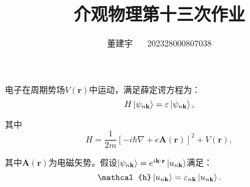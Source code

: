 \documentclass[reqno,a4paper,12pt]{amsart}
\title{介观物理第十三次作业}
\author{董建宇 ~~ 202328000807038}
\begin{document}
\maketitle

电子在周期势场$V(\mathbf{r})$中运动，满足薛定谔方程为：
\[
	H \ket{\psi_{n\mathbf{k}}} = \varepsilon \ket{\psi_{n\mathbf{k}}},
\]

其中
\[
	H = \frac{1}{2m} [-i\hbar\nabla + e\mathbf{A}(\mathbf{r})]^2 + V(\mathbf{r}),
\]

其中$\mathbf{A}(\mathbf{r})$为电磁矢势。假设$\ket{\psi_{n\mathbf{k}}} = e^{i\mathbf{k}\cdot\mathbf{r}} \ket{u_{n\mathbf{k}}}$满足：
\[
	\mathcal{h} \ket{u_{n\mathbf{k}}} = \varepsilon_{n\mathbf{k}} \ket{u_{n\mathbf{k}}}.
\]
\end{document}
